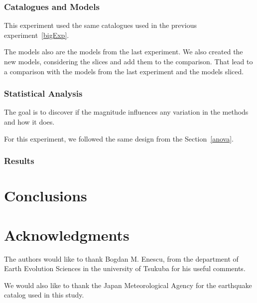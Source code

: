 \subsubsection{Catalogues and Models }
This experiment used the same catalogues used in the previous experiment~\ref{bigExp}. 

The models also are the models from the last experiment. We also created the new models, considering the slices and add them to the comparison. That lead to a comparison with the models from the last experiment and the models sliced.


\subsubsection{Statistical Analysis}
The goal is to discover if the magnitude influences any variation in the methods and how it does.

For this experiment, we followed the same design from the Section~\ref{anova}.

\subsubsection{Results}\label{Results}




\section{Conclusions}\label{Conclusions}

\section*{Acknowledgments}
The authors would like to thank Bogdan M. Enescu, from the department
of Earth Evolution Sciences in the university of Tsukuba for his
useful comments. 

We would also like to thank the Japan Meteorological Agency for the
earthquake catalog used in this study.
